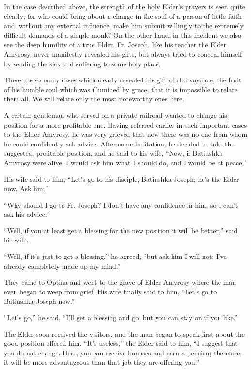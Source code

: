 In the case described above, the strength of the holy Elder's prayers is seen quite clearly; for who could bring about a change in the soul of a person of little faith and, without any external influence, make him submit willingly to the extremely difficult demands of a simple monk? On the other hand, in this incident we also see the deep humility of a true Elder. Fr. Joseph, like his teacher the Elder Amvrosy, never manifestly revealed his gifts, but always tried to conceal himself by sending the sick and suffering to some holy place.

There are so many cases which clearly revealed his gift of clairvoyance, the fruit of his humble soul which was illumined by grace, that it is impossible to relate them all. We will relate only the most noteworthy ones here.

A certain gentleman who served on a private railroad wanted to change his position for a more profitable one. Having referred earlier in such important cases to the Elder Amvrosy, he was very grieved that now there was no one from whom he could confidently ask advice. After some hesitation, he decided to take the suggested, profitable position, and he said to his wife, ``Now, if Batiushka Amvrosy were alive, I would ask him what I should do, and I would be at peace.''

His wife said to him, ``Let's go to his disciple, Batiushka Joseph; he's the Elder now. Ask him.''

``Why should I go to Fr. Joseph? I don't have any confidence in him, so I can't ask his advice.''

``Well, if you at least get a blessing for the new position it will be better,'' said his wife.

``Well, if it's just to get a blessing,'' he agreed, ``but ask him I will not; I've already completely made up my mind.''

They came to Optina and went to the grave of Elder Amvrosy where the man even began to weep from grief. His wife finally said to him, ``Let's go to Batiushka Joseph now.''

``Let's go,'' he said, ``I'll get a blessing and go, but you can stay on if you like.''

The Elder soon received the visitors, and the man began to speak first about the good position offered him. ``It's useless,'' the Elder said to him, ``I suggest that you do not change. Here, you can receive bonuses and earn a pension; therefore, it will be more advantageous than that job they are offering you.''

